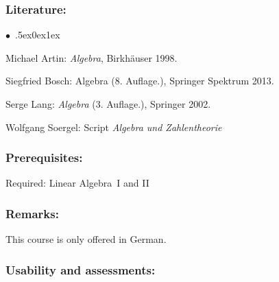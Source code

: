 \documentclass[a4paper,10pt]{article}
\renewenvironment{itemize}{\begin{list}{$\bullet$\ }{\itemsep.5ex\setlength{\topsep}{0.5\itemsep}\parsep0ex\labelsep1ex\settowidth{\labelwidth}{$\bullet$\ }\setlength{\leftmargin}{\labelwidth}\addtolength{\leftmargin}{3ex}\addtolength{\leftmargin}{\labelsep}}}{\end{list}}
\begin{document}
\subsubsection*{\large
    Literature:
}
\begin{itemize}
\item Michael Artin: \emph{Algebra}, Birkhäuser 1998.
\item Siegfried Bosch: Algebra (8. Auf\/lage.), Springer Spektrum 2013.
\item Serge Lang: \emph{Algebra} (3. Auf\/lage.), Springer 2002.
\item Wolfgang Soergel: Script \emph{Algebra und Zahlentheorie}
\end{itemize}
\subsubsection*{\large
    Prerequisites:
}
Required: Linear Algebra~I and II
\subsubsection*{\large
    Remarks:
}
This course is only offered in German.
\cleardoublepage
\subsubsection*{\large
    Usability and assessments:
}
\end{document}

